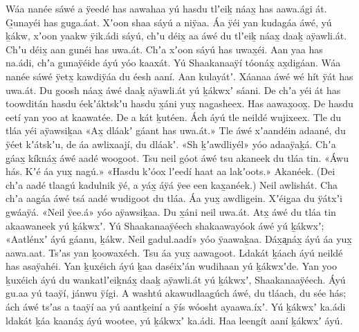 \begin{pairs}
\begin{Leftside}
Wáa nanée sáwé a ÿeedé has aawahaa yú hasdu tlʼeiḵ náax̱ has aawa.ági át.
G̱unayéi has gug̱a.áat.
Xʼoon shaa sáyú a niÿaa.
Áa ÿéi yan kudagáa áwé, yú ḵákw, xʼoon yaakw ÿik.ádi sáyú,
chʼu déix̱ aa áwé du tlʼeiḵ náax̱ daaḵ aÿawli.át.
Chʼu déix̱ aan g̱unéi has uwa.át.
Chʼa xʼoon sáyú has uwax̱éi.
\pend
\pstart
{}Aan yaa has na.ádi, chʼa g̱unaÿéide áyú yóo kaaxát.
Yú Shaakanaaÿí tóonáx̱ ax̱di\-gáan.
Wáa nanée sáwé ÿetx̱ kawdiÿáa du éesh aaní.
Aan kulayátʼ.
Xáanaa áwé wé hít ÿát has uwa.át.
Du goosh náax̱ áwé daaḵ aÿawli.át yú ḵákwxʼ sáani.
De chʼa yéi át has toowditán hasdu éekʼáktskʼu hasdu x̱áni yux̱ nag̱asheex.
Has aawax̱oox̱.
De hasdu eetí yan yoo at kaawatée.
De a kát ḵutéen.
Ách áyú tle neildé wujixeex.
Tle du tláa yéi aÿawsiḵaa
«\!Ax̱ dláakʼ gáant has uwa.át.\!»
Tle áwé xʼaandéin adaané, du ÿéet kʼátskʼu, de áa awlixaají, du dláakʼ.
«\!Sh ḵʼawdliyél\!»
yóo adaaÿaḵá.
Chʼa g̱áax̱ kíknáx̱ áwé aadé woogoot.
Tsu neil góot áwé tsu akaneek du tláa tin.
«\!Áwu hás.
Kʼé áa yux̱ nagú.\!»
«\!Hasdu kʼóox lʼeedí haat aa lakʼoots.\!»
Akanéek.
(Dei chʼa aadé tlaagú kadulnik ÿé, a yáx̱ áÿá ÿee een kax̱anéek.)
Neil awlishát.
Cha chʼa aag̱áa áwé tsá aadé wudigoot du tláa.
Áa yux̱ aw\-dlig̱ein.
Xʼéig̱aa du ÿátxʼi gwáaÿá.
«\!Neil ÿee.á\!»
yóo aÿawsiḵaa.
Du x̱áni neil uwa\-.át.
Atx̱ áwé du tláa tin akaawaneek yú \mbox{ḵákwxʼ.}
Yú Shaakanaaÿéech shakaawayóok áwé yú ḵákwxʼ;
«\!Aatlénxʼ áyú gáanu, ḵákw.
Neil g̱adul.aadí\!»
yóo ÿaawaḵaa.
Dáx̱a̬\-náx̱ áyú áa yux̱ aawa.aat.
Tsʼas yan ḵoowa\-xéch.
Tsu áa yux̱ aawagoot.
Ldakát ḵáach áyú neildé has asaÿahéi.
Yan ḵuxéich áyú ḵaa daséixʼán wudihaan yú ḵákwxʼde.
Yan yoo ḵuxéich áyú du wankatlʼeiḵnáx̱ daaḵ aÿawli.át yú ḵákwxʼ, Shaakanaaÿéech.
Áyú gu.aa yú taaÿí, jánwu ÿígi.
A washtú akawudlaagúch áwé, du tláach, du sée hás;
ách áwé tsʼas a taaÿí aa yú aantḵeiní a ÿís wóosht ayaawa.íxʼ.
Yú ḵákwxʼ ka.ádi ldakát ḵáa kaanáx̱ áyú wootee, yú ḵákwxʼ ka.ádi.
Haa leengít aaní ḵákwxʼ áyú.
\pend
\endnumbering
\end{Leftside}
\begin{Rightside}

\end{Rightside}
\end{pairs}
